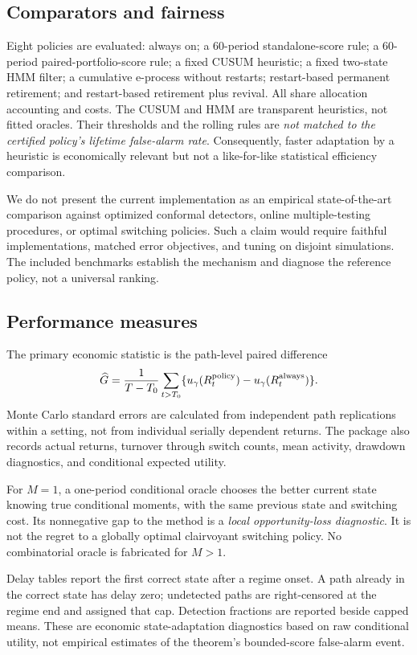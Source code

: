 \subsection{Comparators and fairness}
Eight policies are evaluated: always on; a 60-period standalone-score rule; a 60-period paired-portfolio-score rule; a fixed CUSUM heuristic; a fixed two-state HMM filter; a cumulative e-process without restarts; restart-based permanent retirement; and restart-based retirement plus revival. All share allocation accounting and costs. The CUSUM and HMM are transparent heuristics, not fitted oracles. Their thresholds and the rolling rules are \emph{not matched to the certified policy's lifetime false-alarm rate}. Consequently, faster adaptation by a heuristic is economically relevant but not a like-for-like statistical efficiency comparison.

We do not present the current implementation as an empirical state-of-the-art comparison against optimized conformal detectors, online multiple-testing procedures, or optimal switching policies. Such a claim would require faithful implementations, matched error objectives, and tuning on disjoint simulations. The included benchmarks establish the mechanism and diagnose the reference policy, not a universal ranking.

\subsection{Performance measures}
The primary economic statistic is the path-level paired difference
\begin{equation}
 \widehat G=\frac{1}{T-T_0}\sum_{t>T_0}
       \{u_\gamma(R_t^{\rm policy})-u_\gamma(R_t^{\rm always})\}.
\end{equation}
Monte Carlo standard errors are calculated from independent path replications within a setting, not from individual serially dependent returns. The package also records actual returns, turnover through switch counts, mean activity, drawdown diagnostics, and conditional expected utility.

For $M=1$, a one-period conditional oracle chooses the better current state knowing true conditional moments, with the same previous state and switching cost. Its nonnegative gap to the method is a \emph{local opportunity-loss diagnostic}. It is not the regret to a globally optimal clairvoyant switching policy. No combinatorial oracle is fabricated for $M>1$.

Delay tables report the first correct state after a regime onset. A path already in the correct state has delay zero; undetected paths are right-censored at the regime end and assigned that cap. Detection fractions are reported beside capped means. These are economic state-adaptation diagnostics based on raw conditional utility, not empirical estimates of the theorem's bounded-score false-alarm event.

